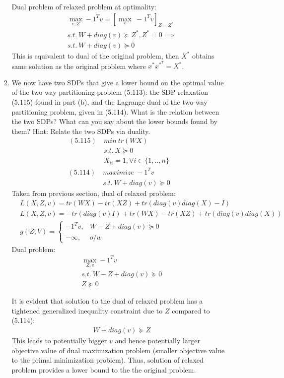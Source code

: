 \documentclass[12pt,letter]{article}
\begin{document}
\begin{enumerate}
\begin{enumerate}
\begin{enumerate}
    Dual problem of relaxed problem at optimality:
    \begin{align*}
      &\max_{v,Z} -1^T v = [\max_{v}\ -1^T v]_{Z=Z^*}\\
      &s.t.\ W + diag(v) \succeq Z^*, Z^*=0 \implies \\
      &s.t.\ W + diag(v) \succeq 0
    \end{align*}
    This is equivalent to  dual of the original problem, then $X^*$ obtains same solution as the original problem where $x^*x^*^T=X^*$.
    \pagebreak
  \item
    We now have two SDPs that give a lower bound on the optimal value of the two-way partitioning problem (5.113): the SDP relaxation (5.115) found in part (b), and the Lagrange dual of the two-way partitioning problem, given in (5.114). What is the relation between the two SDPs? What can you say about the lower bounds found by them? Hint: Relate the two SDPs via duality.
    \begin{align*}
      (5.115)\ &min\ tr(W X)\\
               &s.t.\ X \succeq 0\\
               &X_{ii} = 1, \forall i \in \{1,..,n\}
    \end{align*}
    \begin{align*}
      (5.114)\ &maximize\ -1^T v\\
               &s.t.\ W + diag(v) \succeq 0
    \end{align*}    
    Taken from previous section, dual of relaxed problem:
    \begin{align*}
      &L(X,Z,v) = tr(WX) - tr(XZ) + tr(diag(v)diag(X)-I)\\
      &L(X,Z,v) = -tr(diag(v)I) + tr(WX) - tr(XZ) + tr(diag(v)diag(X))\\
      &g(Z,V) =
        \begin{cases}
          -1^T v ,& W - Z + diag(v) \succeq 0\\
          -\infty ,& o/w
        \end{cases}
    \end{align*}
    Dual problem:
    \begin{align*}
      &\max_{Z,v} -1^T v\\
      &s.t.\ W - Z + diag(v) \succeq 0\\
        &Z \succeq 0
      \end{align*}

      It is evident that solution to the dual of relaxed problem has a tightened generalized inequality constraint due to $Z$ compared to (5.114):
      \begin{align*}
        &W + diag(v) \succeq Z
      \end{align*}
      This leads to potentially bigger $v$ and hence potentially larger objective value of dual maximization problem (smaller objective value to the primal minimization problem). Thus, solution of relaxed problem provides a lower bound to the the original problem.\\
    \end{enumerate}
    

\end{enumerate}
\end{enumerate}
\end{document}
